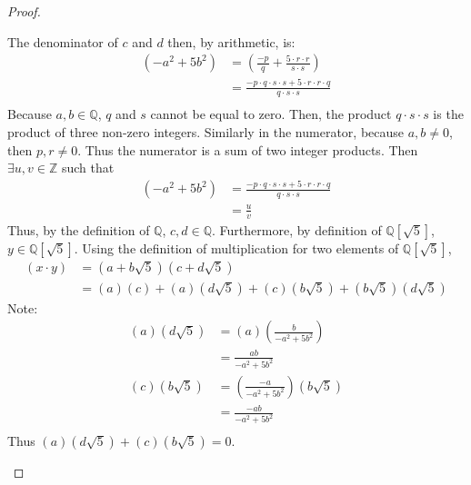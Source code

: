 \documentclass{article}
\begin{document}
\begin{proof}
\begin{description}
          The denominator of $c$ and $d$ then, by arithmetic, is:
          \begin{align*}
            (-a^2 + 5b^2) & = (\frac{-p}{q} + \frac{5 \cdot r \cdot r}{s \cdot s}) \\
                          & = \frac{-p \cdot q \cdot s \cdot s + 5 \cdot r \cdot r 
                          \cdot q}{q \cdot s \cdot s} \\ 
          \end{align*}
          Because $a,b \in \mathbb{Q}$, $q$ and $s$ cannot be equal to zero. Then, the product
          $q \cdot s \cdot s$ is the product of three non-zero integers. Similarly in the
          numerator, because $a,b \neq 0$, then $p, r \neq 0$. Thus the numerator is a sum of
          two integer products. Then $\exists u,v \in \mathbb{Z}$ such that 
          \begin{align*}
            (-a^2 + 5b^2) & = \frac{-p \cdot q \cdot s \cdot s + 5 \cdot r \cdot r 
                          \cdot q}{q \cdot s \cdot s} \\ 
                          & = \frac{u}{v}
          \end{align*}
           Thus, by the definition of $\mathbb{Q}$, $c,d \in \mathbb{Q}$. Furthermore, by
           definition of $\mathbb{Q}[\sqrt{5}]$, $y \in \mathbb{Q}[\sqrt{5}]$. Using the 
           definition of multiplication for two elements of $\mathbb{Q}[\sqrt{5}]$,
           \begin{align*}
             (x \cdot y) &= (a+b\sqrt{5})(c+d\sqrt{5}) \\
                         &= (a)(c) + (a)(d\sqrt{5}) + (c)(b\sqrt{5}) + (b\sqrt{5})(d\sqrt{5})
           \end{align*}
           Note:
           \begin{align*}
              (a)(d\sqrt{5}) &= (a)(\frac{b}{-a^2+5b^2}) \\
                             &= \frac{ab}{-a^2+5b^2} \\
              (c)(b\sqrt{5}) &= (\frac{-a}{-a^2+5b^2})(b\sqrt{5}) \\
                             &= \frac{-ab}{-a^2+5b^2} \\
           \end{align*}
           Thus $(a)(d\sqrt{5}) + (c)(b\sqrt{5}) = 0$. \\
           

\end{description}
\end{proof}
\end{document}
